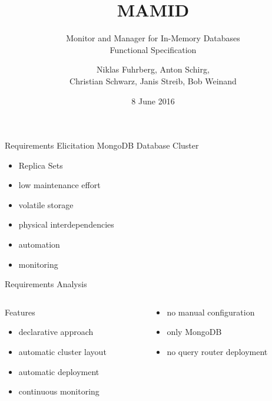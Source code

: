 \documentclass[11pt,aspectratio=169]{beamer}
\begin{document}
	\author{Niklas Fuhrberg, Anton Schirg,\\ Christian Schwarz, Janis Streib, Bob Weinand}
	\title{MAMID}
	\subtitle{Monitor and Manager for In-Memory Databases\\Functional Specification}
	\date{8 June 2016}
	\subject{Functional Specification}
	\frame[plain]{\maketitle}
	
	\begin{frame}{Requirements Elicitation}
		MongoDB Database Cluster
		\begin{itemize}
			\item<2-> Replica Sets
			\item<3-> low maintenance effort
			\item<4-> volatile storage
			\item<5-> physical interdependencies
			\item<6-> automation
			\item<7-> monitoring
		\end{itemize}
	\end{frame}
	
	
	\begin{frame}{Requirements Analysis}
		\begin{columns}
			\begin{column}{0.5\linewidth}
				Features
				\pause
				\begin{itemize}
					\item<2-> declarative approach
					\item<3-> automatic cluster layout
					\item<4-> automatic deployment
					\item<5-> continuous monitoring
				\end{itemize}
			\end{column}
			\begin{column}{0.5\linewidth}
				\onslide<6->{Demarcation}
				\begin{itemize}
					\item<7-> no manual configuration
					\item<8-> only MongoDB
					\item<9-> no query router deployment
				\end{itemize}
				\vspace{1.5em} %
			\end{column}
		\end{columns}

	\end{frame}
	
\end{document}
